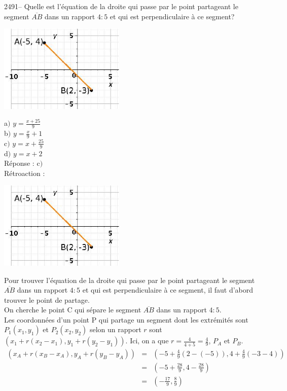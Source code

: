 \documentclass[letterpaper, 12pt]{article}
\begin{document}
2491-- Quelle est l'\'equation de la droite qui passe par le point partageant le segment $\overline{AB}$ dans un rapport $4:5$ et qui est perpendiculaire \`a ce segment?\\
\begin{center}
 \includegraphics[width=6cm,bb=14 14 329 231]{Q2488.eps}
\end{center}

a$)$ $y=\frac{x+25}{9}$\\[2mm]
b$)$ $y=\frac{x}{9}+1$\\[2mm]
c$)$ $y=x+\frac{25}{9}$\\[2mm]
d$)$ $y=x+2$\\

R\'eponse : c$)$\\

R\'etroaction :\\
\begin{center}
 \includegraphics[width=6cm,bb=14 14 329 231]{Q2488.eps}
\end{center}
Pour trouver l'\'equation de la droite qui passe par le point partageant le segment $\overline{AB}$ dans un rapport $4:5$ et qui est perpendiculaire \`a ce segment, il faut d'abord trouver le point de partage.\\

On cherche le point C qui s\'epare le segment $\overline{AB}$ dans un rapport $4:5$.\\
Les coordonn\'ees d'un point P qui partage un segment dont les extr\'emit\'es sont $P_{1}(x_{1}, y_{1})$ et $P_{2}(x_{2}, y_{2})$ selon un rapport $r$ sont $\left( x_{1}+r(x_{2}-x_{1}), y_{1}+r(y_{2}-y_{1})\right) $. Ici, on a que $r=\frac{4}{4+5}=\frac{4}{9}$, $P_{A}$ et $P_{B}$.
\begin{eqnarray*}
\left( x_{A}+r(x_{B}-x_{A}), y_{A}+r(y_{B}-y_{A})\right)&=&\left( -5+\frac{4}{9}(2-(-5)), 4+\frac{4}{9}(-3-4)\right)\\[2mm]
&=&\left( -5+\frac{28}{9}, 4-\frac{28}{9}\right)\\[2mm]
&=&\left( -\frac{17}{9}, \frac{8}{9}\right)\\[2mm]
\end{eqnarray*}
\end{document}
